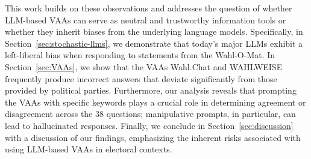 \documentclass[
	fontsize=10pt,          %
	numbers=noenddot,    	%
    parskip=half,        	%
    listof=totoc,        	%
    bibliography=totoc,  	%
	headsepline=true,       %
	footsepline=false, 		%
    DIV=12                	%
]{scrartcl}
\begin{document}
This work builds on these observations and addresses the question of whether LLM-based VAAs can serve as neutral and trustworthy information tools or whether they inherit biases from the underlying language models.
Specifically, in Section~\ref{sec:stochastic-llms}, we demonstrate that today’s major LLMs exhibit a left-liberal bias when responding to statements from the Wahl-O-Mat.
In Section~\ref{sec:VAAs}, we show that the VAAs Wahl.Chat and WAHLWEISE frequently produce incorrect answers that deviate significantly from those provided by political parties.
Furthermore, our analysis reveals that prompting the VAAs with specific keywords plays a crucial role in determining agreement or disagreement across the 38 questions; manipulative prompts, in particular, can lead to hallucinated responses.
Finally, we conclude in Section~\ref{sec:discussion} with a discussion of our findings, emphasizing the inherent risks associated with using LLM-based VAAs in electoral contexts.


\end{document}
